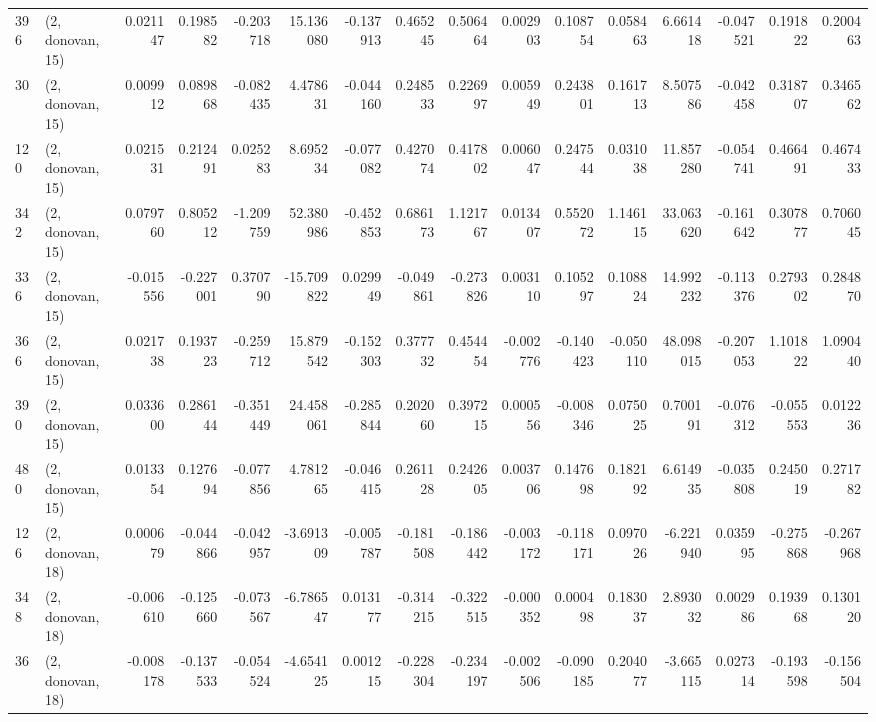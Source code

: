 \begin{tabular}{llrrrrrrrrrrrrrr}
396 &  (2, donovan, 15) &   0.021147 &  0.198582 & -0.203718 &  15.136080 & -0.137913 &   0.465245 &  0.506464 &  0.002903 &  0.108754 &  0.058463 &     6.661418 &  -0.047521 &   0.191822 &   0.200463 \\
30  &  (2, donovan, 15) &   0.009912 &  0.089868 & -0.082435 &   4.478631 & -0.044160 &   0.248533 &  0.226997 &  0.005949 &  0.243801 &  0.161713 &     8.507586 &  -0.042458 &   0.318707 &   0.346562 \\
120 &  (2, donovan, 15) &   0.021531 &  0.212491 &  0.025283 &   8.695234 & -0.077082 &   0.427074 &  0.417802 &  0.006047 &  0.247544 &  0.031038 &    11.857280 &  -0.054741 &   0.466491 &   0.467433 \\
342 &  (2, donovan, 15) &   0.079760 &  0.805212 & -1.209759 &  52.380986 & -0.452853 &   0.686173 &  1.121767 &  0.013407 &  0.552072 &  1.146115 &    33.063620 &  -0.161642 &   0.307877 &   0.706045 \\
336 &  (2, donovan, 15) &  -0.015556 & -0.227001 &  0.370790 & -15.709822 &  0.029949 &  -0.049861 & -0.273826 &  0.003110 &  0.105297 &  0.108824 &    14.992232 &  -0.113376 &   0.279302 &   0.284870 \\
366 &  (2, donovan, 15) &   0.021738 &  0.193723 & -0.259712 &  15.879542 & -0.152303 &   0.377732 &  0.454454 & -0.002776 & -0.140423 & -0.050110 &    48.098015 &  -0.207053 &   1.101822 &   1.090440 \\
390 &  (2, donovan, 15) &   0.033600 &  0.286144 & -0.351449 &  24.458061 & -0.285844 &   0.202060 &  0.397215 &  0.000556 & -0.008346 &  0.075025 &     0.700191 &  -0.076312 &  -0.055553 &   0.012236 \\
480 &  (2, donovan, 15) &   0.013354 &  0.127694 & -0.077856 &   4.781265 & -0.046415 &   0.261128 &  0.242605 &  0.003706 &  0.147698 &  0.182192 &     6.614935 &  -0.035808 &   0.245019 &   0.271782 \\
126 &  (2, donovan, 18) &   0.000679 & -0.044866 & -0.042957 &  -3.691309 & -0.005787 &  -0.181508 & -0.186442 & -0.003172 & -0.118171 &  0.097026 &    -6.221940 &   0.035995 &  -0.275868 &  -0.267968 \\
348 &  (2, donovan, 18) &  -0.006610 & -0.125660 & -0.073567 &  -6.786547 &  0.013177 &  -0.314215 & -0.322515 & -0.000352 &  0.000498 &  0.183037 &     2.893032 &   0.002986 &   0.193968 &   0.130120 \\
36  &  (2, donovan, 18) &  -0.008178 & -0.137533 & -0.054524 &  -4.654125 &  0.001215 &  -0.228304 & -0.234197 & -0.002506 & -0.090185 &  0.204077 &    -3.665115 &   0.027314 &  -0.193598 &  -0.156504 \\

\end{tabular}
